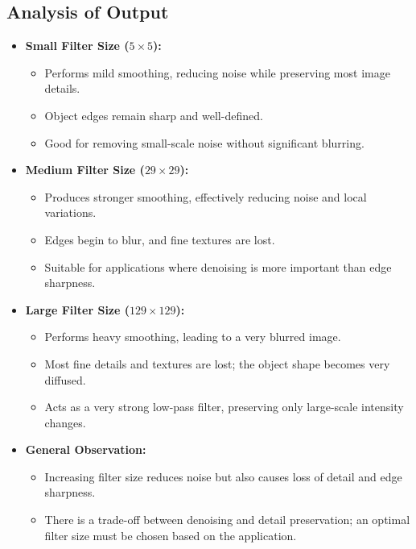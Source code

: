 \documentclass[12pt]{article}
\begin{document}
\subsection{Analysis of Output}
\begin{itemize}
    \item \textbf{Small Filter Size ($5 \times 5$):} 
    \begin{itemize}
        \item Performs mild smoothing, reducing noise while preserving most image details.
        \item Object edges remain sharp and well-defined.
        \item Good for removing small-scale noise without significant blurring.
    \end{itemize}
    
    \item \textbf{Medium Filter Size ($29 \times 29$):} 
    \begin{itemize}
        \item Produces stronger smoothing, effectively reducing noise and local variations.
        \item Edges begin to blur, and fine textures are lost.
        \item Suitable for applications where denoising is more important than edge sharpness.
    \end{itemize}
    
    \item \textbf{Large Filter Size ($129 \times 129$):} 
    \begin{itemize}
        \item Performs heavy smoothing, leading to a very blurred image.
        \item Most fine details and textures are lost; the object shape becomes very diffused.
        \item Acts as a very strong low-pass filter, preserving only large-scale intensity changes.
    \end{itemize}
    
    \item \textbf{General Observation:} 
    \begin{itemize}
        \item Increasing filter size reduces noise but also causes loss of detail and edge sharpness.
        \item There is a trade-off between denoising and detail preservation; an optimal filter size must be chosen based on the application.
    \end{itemize}
\end{itemize}
\end{document}
